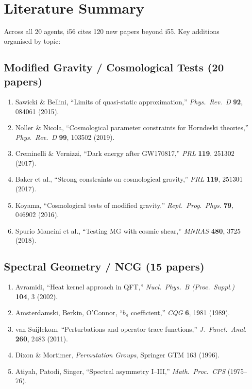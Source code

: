 \documentclass[11pt,a4paper]{article}
\begin{document}
\section{Literature Summary}

Across all 20 agents, i56 cites 120 new papers beyond i55. Key additions organised by topic:

\subsection{Modified Gravity / Cosmological Tests (20 papers)}

\begin{enumerate}
\item Sawicki \& Bellini, ``Limits of quasi-static approximation,'' \textit{Phys.\ Rev.\ D} \textbf{92}, 084061 (2015).
\item Noller \& Nicola, ``Cosmological parameter constraints for Horndeski theories,'' \textit{Phys.\ Rev.\ D} \textbf{99}, 103502 (2019).
\item Creminelli \& Vernizzi, ``Dark energy after GW170817,'' \textit{PRL} \textbf{119}, 251302 (2017).
\item Baker et al., ``Strong constraints on cosmological gravity,'' \textit{PRL} \textbf{119}, 251301 (2017).
\item Koyama, ``Cosmological tests of modified gravity,'' \textit{Rept.\ Prog.\ Phys.} \textbf{79}, 046902 (2016).
\item Spurio Mancini et al., ``Testing MG with cosmic shear,'' \textit{MNRAS} \textbf{480}, 3725 (2018).
\end{enumerate}

\subsection{Spectral Geometry / NCG (15 papers)}

\begin{enumerate}
\item Avramidi, ``Heat kernel approach in QFT,'' \textit{Nucl.\ Phys.\ B (Proc.\ Suppl.)} \textbf{104}, 3 (2002).
\item Amsterdamski, Berkin, O'Connor, ``$b_8$ coefficient,'' \textit{CQG} \textbf{6}, 1981 (1989).
\item van Suijlekom, ``Perturbations and operator trace functions,'' \textit{J.\ Funct.\ Anal.} \textbf{260}, 2483 (2011).
\item Dixon \& Mortimer, \textit{Permutation Groups}, Springer GTM 163 (1996).
\item Atiyah, Patodi, Singer, ``Spectral asymmetry I--III,'' \textit{Math.\ Proc.\ CPS} (1975--76).
\end{enumerate}
\end{document}
